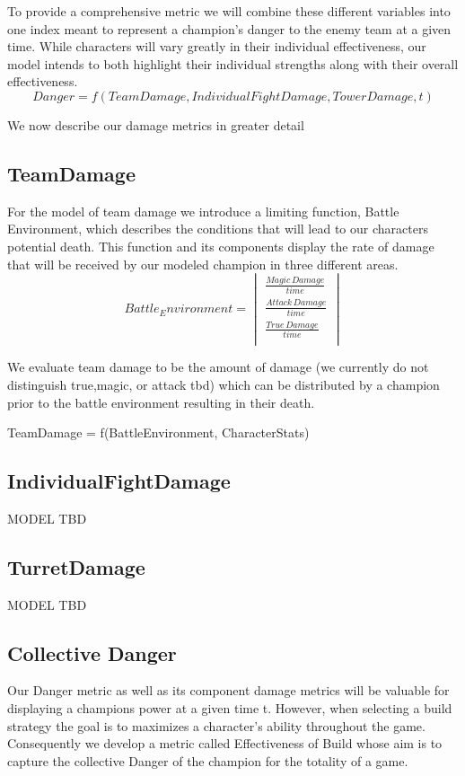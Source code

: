 \documentclass{article}
\begin{document}
To provide a comprehensive metric we will combine these different variables into one index meant to represent a champion's danger to the enemy team at a given time.  While characters will vary greatly in their individual effectiveness, our model intends to both highlight their individual strengths along with their overall effectiveness.
\begin{equation}
Danger = f(TeamDamage, IndividualFightDamage, TowerDamage, t)
\end{equation}

We now describe our damage metrics in greater detail

\subsection{TeamDamage}
For the model of team damage we introduce a limiting function, Battle Environment, which describes the conditions that will lead to our characters potential death.  This function and its components display the rate of damage that will be received by our modeled champion in three different areas.  
\begin{equation}
Battle_Environment = 
\begin{vmatrix}
    \frac{Magic\hspace{2pt} Damage}{time} \\
    \frac{Attack\hspace{2pt}Damage}{time}  \\
    \frac{True\hspace{2pt}Damage}{time} \\
\end{vmatrix}
\end{equation}

We evaluate team damage to be the amount of damage (we currently do not distinguish true,magic, or attack tbd) which can be distributed by a champion prior to the battle environment resulting in their death.

TeamDamage = f(BattleEnvironment, CharacterStats)

\subsection{IndividualFightDamage} MODEL TBD
\subsection{TurretDamage}  MODEL TBD


\subsection{Collective Danger}
Our Danger metric as well as its component damage  metrics will be valuable for displaying a champions power at a given time t.  However, when selecting a build strategy the goal is to maximizes a character's ability throughout the game.  Consequently we develop a metric called Effectiveness of Build whose aim is to capture the collective Danger of the champion for the totality of a game.
\end{document}
